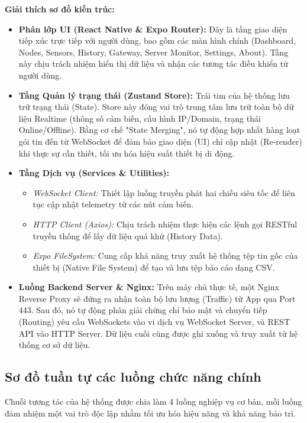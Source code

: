 \documentclass{article}
\begin{document}
\textbf{Giải thích sơ đồ kiến trúc:}
\begin{itemize}
    \item \textbf{Phân lớp UI (React Native \& Expo Router):} Đây là tầng giao diện tiếp xúc trực tiếp với người dùng, bao gồm các màn hình chính (Dashboard, Nodes, Sensors, History, Gateway, Server Monitor, Settings, About). Tầng này chịu trách nhiệm hiển thị dữ liệu và nhận các tương tác điều khiển từ người dùng.
    \item \textbf{Tầng Quản lý trạng thái (Zustand Store):} Trái tim của hệ thống lưu trữ trạng thái (State). Store này đóng vai trò trung tâm lưu trữ toàn bộ dữ liệu Realtime (thông số cảm biến, cấu hình IP/Domain, trạng thái Online/Offline). Bằng cơ chế "State Merging", nó tự động hợp nhất hàng loạt gói tin đến từ WebSocket để đảm bảo giao diện (UI) chỉ cập nhật (Re-render) khi thực sự cần thiết, tối ưu hóa hiệu suất thiết bị di động.
    \item \textbf{Tầng Dịch vụ (Services \& Utilities):}
    \begin{itemize}
        \item \textit{WebSocket Client:} Thiết lập luồng truyền phát hai chiều siêu tốc để liên tục cập nhật telemetry từ các nút cảm biến.
        \item \textit{HTTP Client (Axios):} Chịu trách nhiệm thực hiện các lệnh gọi RESTful truyền thống để lấy dữ liệu quá khứ (History Data).
        \item \textit{Expo FileSystem:} Cung cấp khả năng truy xuất hệ thống tệp tin gốc của thiết bị (Native File System) để tạo và lưu tệp báo cáo dạng CSV.
    \end{itemize}
    \item \textbf{Luồng Backend Server \& Nginx:} Trên máy chủ thực tế, một Nginx Reverse Proxy sẽ đứng ra nhận toàn bộ lưu lượng (Traffic) từ App qua Port 443. Sau đó, nó tự động phân giải chứng chỉ bảo mật và chuyển tiếp (Routing) yêu cầu WebSockets vào vi dịch vụ WebSocket Server, và REST API vào HTTP Server. Dữ liệu cuối cùng được ghi xuống và truy xuất từ hệ thống cơ sở dữ liệu.
\end{itemize}

\subsection{Sơ đồ tuần tự các luồng chức năng chính}
Chuỗi tương tác của hệ thống được chia làm 4 luồng nghiệp vụ cơ bản, mỗi luồng đảm nhiệm một vai trò độc lập nhằm tối ưu hóa hiệu năng và khả năng bảo trì.
\end{document}

